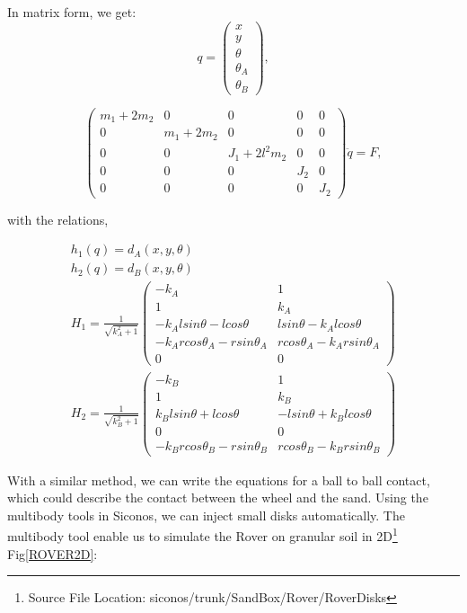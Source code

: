 In matrix form, we get:
\begin{equation}
q=\begin{pmatrix}
x\\y\\ \theta \\ \theta_A \\ \theta_B
\end{pmatrix}, 
\end{equation}

\begin{equation}
\begin{pmatrix} m_1+2m_2 & 0 & 0 & 0 & 0\\
               0 & m_1+2m_2 & 0 & 0 & 0\\
               0 & 0 & J_1+2l^2m_2& 0 & 0\\
               0& 0& 0& J_2 & 0 \\
               0 & 0 & 0& 0& J_2
\end{pmatrix}\ddot{q}=F,
\end{equation}

with the relations,

\begin{eqnarray}
&h_1(q)=d_A(x,y,\theta)& \\
&h_2(q)=d_B(x,y,\theta)&\\
&H_1=\frac{1}{\sqrt{k_A^2+1}}
\begin{pmatrix}
-k_A &1 \\
1 & k_A \\
 -k_Alsin\theta-lcos\theta & lsin\theta-k_Alcos\theta \\
 -k_Arcos\theta_A-rsin\theta_A & rcos\theta_A-k_Arsin\theta_A\\
0& 0 \end{pmatrix}&\\
&H_2=\frac{1}{\sqrt{k_B^2+1}}
\begin{pmatrix}
 -k_B & 1\\
1 & k_B  \\
k_Blsin\theta+lcos\theta & -lsin\theta+k_Blcos\theta\\
0& 0 \\
-k_Brcos\theta_B-rsin\theta_B & rcos\theta_B-k_Brsin\theta_B
 \end{pmatrix}&
\end{eqnarray}


With a similar method, we can write the equations for a ball to ball contact, which could describe the contact between the wheel and the sand. Using the multibody tools in Siconos, we can inject small disks automatically. The multibody tool enable us to simulate the Rover on granular soil in 2D\footnote{Source File Location: siconos/trunk/SandBox/Rover/RoverDisks} Fig\eqref{ROVER2D}:\\


